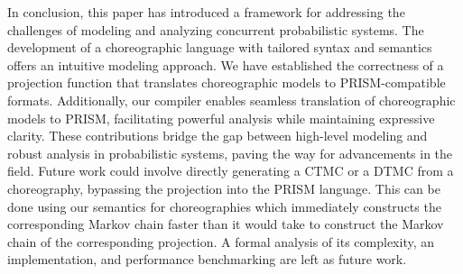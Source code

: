 In conclusion, this paper has introduced a framework for addressing
the challenges of modeling and analyzing concurrent probabilistic
systems.
The development of a choreographic language with tailored syntax and
semantics offers an intuitive modeling approach. We have established
the correctness of a projection function that translates choreographic
models to PRISM-compatible formats. Additionally, our compiler enables
seamless translation of choreographic models to PRISM, facilitating
powerful analysis while maintaining expressive clarity. These
contributions bridge the gap between high-level modeling and robust
analysis in probabilistic systems, paving the way for advancements in
the field. Future work could involve directly generating a CTMC or a
DTMC from a choreography, bypassing the projection into the PRISM
language. This can be done using our semantics for choreographies
which immediately constructs the corresponding Markov chain faster
than it would take to construct the Markov chain of the corresponding
projection. A formal analysis of its complexity, an implementation,
and performance benchmarking are left as future work.

